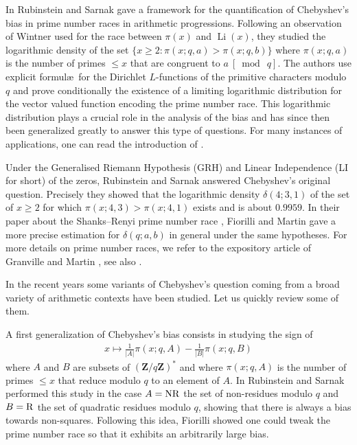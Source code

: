 \documentclass[a4paper,10pt]{amsart}
\theoremstyle{plain}
\theoremstyle{definition}
\begin{document}
In \cite{RS} Rubinstein and Sarnak gave a framework for the quantification of Chebyshev's bias in prime number races in arithmetic progressions.
Following an observation of Wintner \cite{Wintner} used for the race between $\pi(x)$ and $\operatorname{Li}(x)$, 
they studied the logarithmic density of the set
$ \lbrace x \geq 2 : \pi(x; q,a) >\pi(x;q, b) \rbrace $
where $\pi(x; q,a)$ is the number of primes $\leq x$ that are congruent to $a\ [\bmod\ q]$.
The authors use explicit formul\ae\ for the Dirichlet $L$-functions of the primitive characters modulo $q$
and prove conditionally the existence of a 
limiting logarithmic distribution for the vector valued function encoding the prime number race. 
This logarithmic distribution plays a crucial role in the analysis of the bias and  has since then been generalized greatly to answer this type of questions.
For many instances of applications, one can read the introduction of \cite{ANS}.

Under the Generalised Riemann Hypothesis (GRH) and Linear Independence (LI for short) of the zeros, 
Rubinstein and Sarnak answered Chebyshev's original question.
Precisely they showed that the logarithmic density $\delta(4;3,1)$ of the set of $x\geq2$ for which $\pi(x; 4,3)>\pi(x;4, 1)$
exists and is about $0.9959$.
In their paper about the Shanks--Renyi prime number race \cite{FiorilliMartin}, 
Fiorilli and Martin gave a more precise estimation for $\delta(q;a,b)$ in general under the same hypotheses.
For more details on prime number races, we refer to the expository article of Granville and Martin \cite{GranvilleMartin}, see also \cite{FordKonyagin}.

In the recent years some variants of Chebyshev's question coming from a broad variety of arithmetic contexts have been studied. 
Let us quickly review some of them. 

A first generalization of Chebyshev's bias consists in studying the sign of 
\begin{align*}
x \mapsto \frac{1}{\lvert A\rvert}\pi(x; q,A)- \frac{1}{\lvert B\rvert}\pi(x;q, B)
\end{align*} 
where $A$ and $B$ are subsets of $(\mathbf{Z}/q\mathbf{Z})^{*}$
and where $\pi(x; q,A)$ is the number of primes $\leq x$ that reduce modulo $q$ to an element of $A$.
In \cite{RS} Rubinstein and Sarnak performed this study in the case $A=\rm{NR}$ the set of non-residues modulo $q$ and
$B=\rm{R}$ the set of quadratic residues modulo $q$,
showing that there is always a bias towards non-squares.
Following this idea, Fiorilli \cite{Fiorilli_HighlyBiased} showed one could tweak the prime number race so that it exhibits an  arbitrarily large bias.
\end{document}
